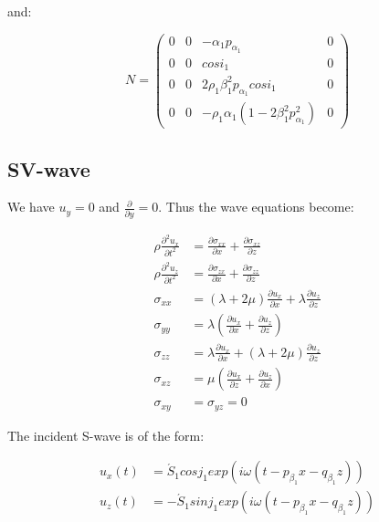 \documentclass[main.tex]{subfiles}
\begin{document}
and:

\begin{equation}
N = \begin{pmatrix}
0 & 0 & - \alpha_1 p_{\alpha_1} & 0 \\
0 & 0 & cos i_1 & 0 \\
0 & 0 & 2 \rho_1 \beta_1^2 p_{\alpha_1} cos i_1 & 0 \\
0 & 0 & - \rho_1 \alpha_1 (1 - 2 \beta_1^2 p_{\alpha_1}^2) & 0
\end{pmatrix}
\end{equation}

\subsection{SV-wave}

We have $u_y = 0$ and $\frac{\partial}{\partial y} = 0$. Thus the wave equations become:

\begin{equation}
\begin{split}
\rho \frac{\partial ^2 u_x}{\partial t^2} & = \frac{\partial \sigma_{xx}}{\partial x} + \frac{\partial \sigma_{xz}}{\partial z} \\
\rho \frac{\partial ^2 u_z}{\partial t^2} & = \frac{\partial \sigma_{zx}}{\partial x} + \frac{\partial \sigma_{zz}}{\partial z} \\
\sigma_{xx} & = (\lambda + 2 \mu) \frac{\partial u_x}{\partial x} + \lambda \frac{\partial u_z}{\partial z} \\
\sigma_{yy} & = \lambda (\frac{\partial u_x}{\partial x} + \frac{\partial u_z}{\partial z}) \\
\sigma_{zz} & = \lambda \frac{\partial u_x}{\partial x} + (\lambda + 2 \mu) \frac{\partial u_z}{\partial z} \\
\sigma_{xz} & = \mu (\frac{\partial u_x}{\partial z} + \frac{\partial u_z}{\partial x}) \\
\sigma_{xy} & = \sigma_{yz} = 0
\end{split}
\end{equation}

The incident S-wave is of the form:

\begin{equation}
\begin{split}
u_x (t) & = \acute S_1 cos j_1 exp (i \omega (t - p_{\beta_1} x - q_{\beta_1} z)) \\
u_z (t) & = - \acute S_1 sin j_1 exp (i \omega (t - p_{\beta_1} x - q_{\beta_1} z))
\end{split}
\end{equation}
\end{document}
